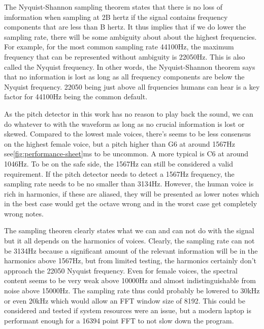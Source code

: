 The Nyquist-Shannon sampling theorem states that there is no loss of imformation when sampling at 2B hertz if the signal contains frequency components that are less than B hertz. It thus implies that if we do lower the sampling rate, there will be some ambiguity about about the highest frequencies. For example, for the most common sampling rate 44100Hz, the maximum frequency that can be represented without ambiguity is 22050Hz. This is also called the Nyquist frequency. In other words, the Nyquist-Shannon theorem says that no information is lost as long as all frequency components are below the Nyquist frequency. 22050 being just above all frquencies humans can hear is a key factor for 44100Hz being the common default. 

As the pitch detector in this work has no reason to play back the sound, we can do whatever to with the waveform as long as no crucial information is lost or skewed. Compared to the lowest male voices, there's seems to be less consensus on the highest female voice, but a pitch higher than G6 at around 1567Hz see\ref{fig:performance-sheet}ms to be uncommon. A more typical is C6 at around 1046Hz. To be on the safe side, the 1567Hz can still be considered a valid requirement. If the pitch detector needs to detect a 1567Hz frequency, the sampling rate needs to be no smaller than 3134Hz. However, the human voice is rich in harmonics, if these are aliased, they will be presented as lower notes which in the best case would get the octave wrong and in the worst case get completely wrong notes.

The sampling theoren clearly states what we can and can not do with the signal but it all depends on the harmonics of voices. Clearly, the sampling rate can not be 3134Hz because a significant amount of the relevant information will be in the harmonics above 1567Hz, but from limited testing, the harmonics certainly don't approach the 22050 Nyquist frequency.  Even for female voices, the spectral content seems to be very weak above 10000Hz and almost indistinguishable from noise above 15000Hz. The sampling rate thus could probably be lowered to 30kHz or even 20kHz which would allow an FFT window size of 8192. This could be considered and tested if system resources were an issue, but a modern laptop is performant enough for a 16394 point FFT to not slow down the program.

